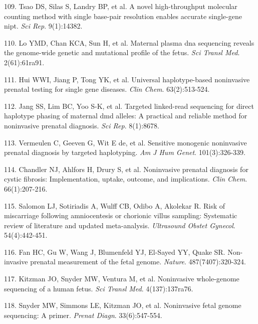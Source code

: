 \documentclass[11pt,letterpaper]{book}
\begin{document}
\leavevmode\hypertarget{ref-tsao:2019ab}{}%
109. Tsao DS, Silas S, Landry BP, et al. A novel high-throughput molecular counting method with single base-pair resolution enables accurate single-gene nipt. \emph{Sci Rep}. 9(1):14382.

\leavevmode\hypertarget{ref-lo:2010aa}{}%
110. Lo YMD, Chan KCA, Sun H, et al. Maternal plasma dna sequencing reveals the genome-wide genetic and mutational profile of the fetus. \emph{Sci Transl Med}. 2(61):61ra91.

\leavevmode\hypertarget{ref-hui:2017aa}{}%
111. Hui WWI, Jiang P, Tong YK, et al. Universal haplotype-based noninvasive prenatal testing for single gene diseases. \emph{Clin Chem}. 63(2):513-524.

\leavevmode\hypertarget{ref-jang:2018aa}{}%
112. Jang SS, Lim BC, Yoo S-K, et al. Targeted linked-read sequencing for direct haplotype phasing of maternal dmd alleles: A practical and reliable method for noninvasive prenatal diagnosis. \emph{Sci Rep}. 8(1):8678.

\leavevmode\hypertarget{ref-vermeulen:2017aa}{}%
113. Vermeulen C, Geeven G, Wit E de, et al. Sensitive monogenic noninvasive prenatal diagnosis by targeted haplotyping. \emph{Am J Hum Genet}. 101(3):326-339.

\leavevmode\hypertarget{ref-chandler:2020aa}{}%
114. Chandler NJ, Ahlfors H, Drury S, et al. Noninvasive prenatal diagnosis for cystic fibrosis: Implementation, uptake, outcome, and implications. \emph{Clin Chem}. 66(1):207-216.

\leavevmode\hypertarget{ref-salomon:2019aa}{}%
115. Salomon LJ, Sotiriadis A, Wulff CB, Odibo A, Akolekar R. Risk of miscarriage following amniocentesis or chorionic villus sampling: Systematic review of literature and updated meta-analysis. \emph{Ultrasound Obstet Gynecol}. 54(4):442-451.

\leavevmode\hypertarget{ref-fan:2012aa}{}%
116. Fan HC, Gu W, Wang J, Blumenfeld YJ, El-Sayed YY, Quake SR. Non-invasive prenatal measurement of the fetal genome. \emph{Nature}. 487(7407):320-324.

\leavevmode\hypertarget{ref-kitzman:2012aa}{}%
117. Kitzman JO, Snyder MW, Ventura M, et al. Noninvasive whole-genome sequencing of a human fetus. \emph{Sci Transl Med}. 4(137):137ra76.

\leavevmode\hypertarget{ref-snyder:2013aa}{}%
118. Snyder MW, Simmons LE, Kitzman JO, et al. Noninvasive fetal genome sequencing: A primer. \emph{Prenat Diagn}. 33(6):547-554.
\end{document}
